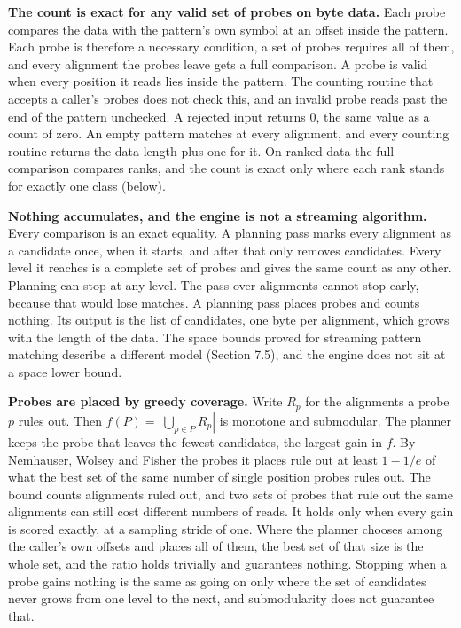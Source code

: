 \noindent\textbf{The count is exact for any valid set of probes on byte data.} Each probe compares the data with the pattern's own symbol at an offset inside the pattern. Each probe is therefore a necessary condition, a set of probes requires all of them, and every alignment the probes leave gets a full comparison. A probe is valid when every position it reads lies inside the pattern. The counting routine that accepts a caller's probes does not check this, and an invalid probe reads past the end of the pattern unchecked. A rejected input returns 0, the same value as a count of zero. An empty pattern matches at every alignment, and every counting routine returns the data length plus one for it. On ranked data the full comparison compares ranks, and the count is exact only where each rank stands for exactly one class (below).

\noindent\textbf{Nothing accumulates, and the engine is not a streaming algorithm.} Every comparison is an exact equality. A planning pass marks every alignment as a candidate once, when it starts, and after that only removes candidates. Every level it reaches is a complete set of probes and gives the same count as any other. Planning can stop at any level. The pass over alignments cannot stop early, because that would lose matches. A planning pass places probes and counts nothing. Its output is the list of candidates, one byte per alignment, which grows with the length of the data. The space bounds proved for streaming pattern matching describe a different model (Section 7.5), and the engine does not sit at a space lower bound.

\noindent\textbf{Probes are placed by greedy coverage.} Write \(R_p\) for the alignments a probe \(p\) rules out. Then \(f(P) = |\bigcup_{p \in P} R_p|\) is monotone and submodular. The planner keeps the probe that leaves the fewest candidates, the largest gain in \(f\). By Nemhauser, Wolsey and Fisher \cite{src:Nemhauser-Wolsey-and-Fisher} the probes it places rule out at least \(1 - 1/e\) of what the best set of the same number of single position probes rules out. The bound counts alignments ruled out, and two sets of probes that rule out the same alignments can still cost different numbers of reads. It holds only when every gain is scored exactly, at a sampling stride of one. Where the planner chooses among the caller's own offsets and places all of them, the best set of that size is the whole set, and the ratio holds trivially and guarantees nothing. Stopping when a probe gains nothing is the same as going on only where the set of candidates never grows from one level to the next, and submodularity does not guarantee that.

